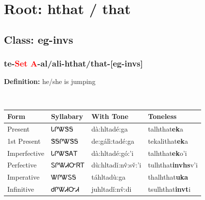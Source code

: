 \needspace{4in}
\section*{Root: hthat / that}
\nopagebreak
{}
\needspace{3in}
\subsection*{Class: eg-invs}
\nopagebreak
\needspace{2in}
\subsubsection*{te{-}\textcolor{Red}{Set A}{-}al/ali{-}\textbf{hthat/that}{-}[eg-invs]}
\nopagebreak
\textbf{Definition: } he/she is jumping
\\[0.5em]
\begin{tabularx}{\textwidth}{l X X X}%
\toprule%
\textbf{Form}&\textbf{Syllabary}&\textbf{With Tone}&\textbf{Toneless}\\%
\midrule%
Present&ᏓᎵᏔᏕᎦ&dà:hltadé:ga&talhthat\textbf{ek}a\\%
1st Present&ᏕᎦᎵᏔᏕᎦ&de:gálì:tadé:ga&tekalithat\textbf{ek}a\\%
Imperfective&ᏓᎵᏔᏕᎪᎢ&dà:hltadé:gó:’i&talhthat\textbf{ek}o'i\\%
Perfective&ᏚᎵᏔᏗᏅᏒᎢ&dù:hltadǐ:nv̂:sv̌:’i&tulhthat\textbf{invhs}v'i\\%
Imperative&ᏔᎵᏔᏚᎦ&táhltadù:ga&thalhthat\textbf{uka}\\%
Infinitive&ᏧᎵᏔᏗᏅᏗ&juhltadǐ:nv̂:di&tsulhthat\textbf{invt}i\\%
\bottomrule%
\end{tabularx}
\\[1em]